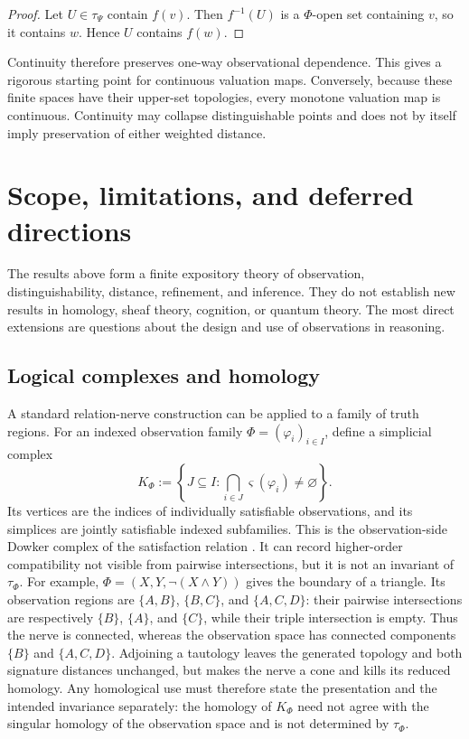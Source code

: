 \documentclass[11pt]{article}
\theoremstyle{definition}
\theoremstyle{plain}
\theoremstyle{remark}
\begin{document}
\begin{proof}
Let $U\in\tau_\Psi$ contain $f(v)$.  Then $f^{-1}(U)$ is a $\Phi$-open set
containing $v$, so it contains $w$.  Hence $U$ contains $f(w)$.
\end{proof}

Continuity therefore preserves one-way observational dependence.  This gives
a rigorous starting point for continuous valuation maps.  Conversely, because
these finite spaces have their upper-set topologies, every monotone valuation
map is continuous.  Continuity may collapse distinguishable points and does not
by itself imply preservation of either weighted distance.

\section{Scope, limitations, and deferred directions}

The results above form a finite expository theory of observation,
distinguishability, distance, refinement, and inference.  They do not establish
new results in homology, sheaf theory, cognition, or quantum theory.  The most
direct extensions are questions about the design and use of observations in
reasoning.

\subsection{Logical complexes and homology}

A standard relation-nerve construction can be applied to a family of truth
regions.  For an indexed observation family
$\Phi=(\varphi_i)_{i\in I}$, define a simplicial complex
\[
 K_\Phi:=\left\{J\subseteq I:
       \bigcap_{i\in J}\varsigma(\varphi_i)\neq\varnothing
       \right\}.
\]
Its vertices are the indices of individually satisfiable observations, and its
simplices are jointly satisfiable indexed subfamilies.  This is the
observation-side Dowker complex
of the satisfaction relation \cite{Dowker1952}.  It can record higher-order
compatibility not visible from pairwise intersections, but it is not an
invariant of $\tau_\Phi$.  For example,
$\Phi=(X,Y,\neg(X\wedge Y))$ gives the boundary of a triangle.  Its observation
regions are $\{A,B\}$, $\{B,C\}$, and $\{A,C,D\}$: their pairwise intersections
are respectively $\{B\}$, $\{A\}$, and $\{C\}$, while their triple intersection
is empty.  Thus the nerve is connected, whereas the observation space has
connected components $\{B\}$ and $\{A,C,D\}$.  Adjoining a
tautology leaves the generated topology and both signature distances unchanged,
but makes the nerve a cone and kills its reduced homology.  Any homological use
must therefore state the presentation and the intended invariance separately:
the homology of $K_\Phi$ need not agree with the singular homology of the
observation space and is not determined by $\tau_\Phi$.
\end{document}
